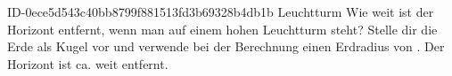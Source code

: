 \begin{exercise}
      {ID-0ece5d543c40bb8799f881513fd3b69328b4db1b}
      {Leuchtturm}
  \ifproblem\problem
    Wie weit ist der Horizont entfernt, wenn man auf einem  hohen
    Leuchtturm steht? Stelle dir die Erde als Kugel vor und verwende bei der
    Berechnung einen Erdradius von .
  \fi
  \ifoutcome\outcome
    Der Horizont ist ca.  weit entfernt.
  \fi
\end{exercise}
